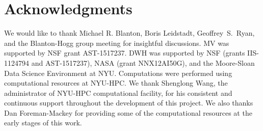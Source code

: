 \documentclass[14pt, preprint]{emulateapj}
\begin{document}
\section*{Acknowledgments}
We would like to thank Michael R. Blanton,  
Boris Leidstadt, Geoffrey~S.~Ryan, and the Blanton-Hogg group meeting for insightful discussions. MV was supported by NSF grant AST-1517237. DWH was supported 
by NSF (grants IIS-1124794 and AST-1517237), NASA (grant NNX12AI50G), and the Moore-Sloan 
Data Science Environment at NYU. Computations 
were performed using computational resources at NYU-HPC. We thank Shenglong Wang, the 
administrator of NYU-HPC computational facility, for his consistent and continuous support 
throughout the development of this project. We also thanks Dan Foreman-Mackey for providing some of the computational resources at the early stages of this work.
\end{document}
